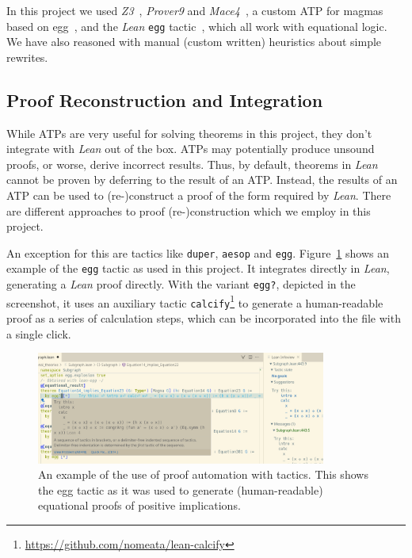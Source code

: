 In this project we used \emph{Z3}~\cite{DBLP:conf/tacas/MouraB08}, \emph{Prover9} and \emph{Mace4}~\cite{prover9-mace4}, a custom ATP for magmas based on egg~\cite{DBLP:journals/pacmpl/WillseyNWFTP21}, and the \emph{Lean} \texttt{egg} tactic~\cite{DBLP:journals/pacmpl/KoehlerGBGTS24,rossel2024equality,rossel2024bridging}, which all work with equational logic. We have also reasoned with manual (custom written) heuristics about simple rewrites.

\subsection{Proof Reconstruction and Integration}
\label{sec:proof-reconstruction}


While ATPs are very useful for solving theorems in this project, they don't integrate with \emph{Lean} out of the box.
ATPs may potentially produce unsound proofs, or worse, derive incorrect results.
Thus, by default, theorems in \emph{Lean} cannot be proven by deferring to the result of an ATP.
Instead, the results of an ATP can be used to (re-)construct a proof of the form required by \emph{Lean}.
There are different approaches to proof (re-)construction which we employ in this project.



An exception for this are tactics like \texttt{duper}, \texttt{aesop} and \texttt{egg}. Figure~\ref{fig:screenshot-egg} shows an example of the \texttt{egg} tactic as used in this project. It integrates directly in \emph{Lean}, generating a \emph{Lean} proof directly. With the variant \texttt{egg?}, depicted in the screenshot, it uses an auxiliary tactic \texttt{calcify}\footnote{\url{https://github.com/nomeata/lean-calcify}} to generate a human-readable proof as a series of calculation steps, which can be incorporated into the file with a single click.

\begin{figure}
  \centering
  \includegraphics[width=0.85\textwidth]{screenshot-egg.png}
  \caption{An example of the use of proof automation with tactics. This shows the egg tactic as it was used to generate (human-readable) equational proofs of positive implications.}
  \label{fig:screenshot-egg}
\end{figure}

